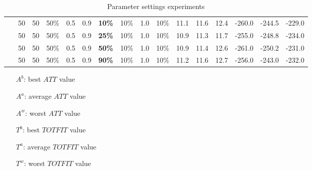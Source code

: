 \begin{table}
\begin{tabular}{|l|l|l|l|l|l|l|l|l|l||l|l|l|l|l|l|}
    ~ & 50 & 50 & 50\% & 0.5 & 0.9 & \textbf{10\%} & 10\% & 1.0 & 10\% &  11.1 & 11.6 & 12.4 & -260.0 & -244.5 & -229.0 \\
    ~ & 50 & 50 & 50\% & 0.5 & 0.9 & \textbf{25\%} & 10\% & 1.0 & 10\% &  10.9 & 11.3 & 11.7 & -255.0 & -248.8 & -234.0 \\
    ~ & 50 & 50 & 50\% & 0.5 & 0.9 & \textbf{50\%} & 10\% & 1.0 & 10\% &  10.9 & 11.4 & 12.6 & -261.0 & -250.2 & -231.0 \\
    ~ & 50 & 50 & 50\% & 0.5 & 0.9 & \textbf{90\%} & 10\% & 1.0 & 10\% &  11.2 & 11.6 & 12.7 & -256.0 & -243.0 & -232.0 \\
    \hline
    \end{tabular}
    \caption {Parameter settings experiments} 
    \begin{itemize}[noitemsep]
    \item[$A^b$:] best $ATT$ value
    \item[$A^a$:] average $ATT$ value
    \item[$A^w$:] worst $ATT$ value
    \item[$T^b$:] best $TOTFIT$ value
    \item[$T^a$:] average $TOTFIT$ value
    \item[$T^w$:] worst $TOTFIT$ value
    \end{itemize}
    \label{table:parameterSettingsLALLA}
\end{table}

